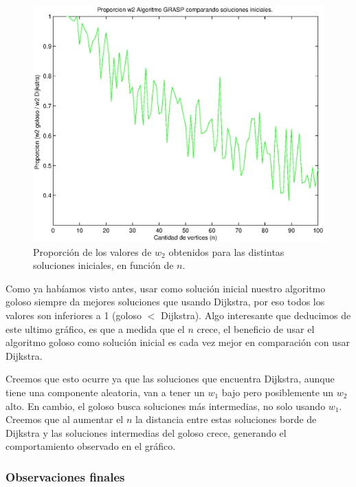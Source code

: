\begin{figure}[H]
  \begin{center}
    \begin{minipage}{0.7\linewidth}
      \includegraphics[width=\linewidth]{graficos/grasp_comparacion_soluciones_iniciales_tiempo.eps}
      \caption{Proporción de los valores de $w_2$ obtenidos para las distintas soluciones iniciales, en función de $n$.}\label{fig:grasp-soluciones-iniciales-tiempo}
    \end{minipage}
  \end{center}
\end{figure}

Como ya habíamos visto antes, usar como solución inicial nuestro algoritmo goloso siempre da mejores soluciones que usando Dijkstra, por eso todos los valores son inferiores a 1 (goloso $<$ Dijkstra). Algo interesante que deducimos de este ultimo gráfico, es que a medida que el $n$ crece, el beneficio de usar el algoritmo goloso como solución inicial es cada vez mejor en comparación con usar Dijkstra.

Creemos que esto ocurre ya que las soluciones que encuentra Dijkstra, aunque tiene una componente aleatoria, van a tener un $w_1$ bajo pero posiblemente un $w_2$ alto. En cambio, el goloso busca soluciones más intermedias, no solo usando $w_1$. Creemos que al aumentar el $n$ la distancia entre estas soluciones borde de Dijkstra y las soluciones intermedias del goloso crece, generando el comportamiento observado en el gráfico.

\subsubsection{Observaciones finales}

